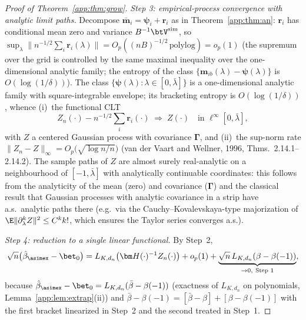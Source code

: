 \begin{proof}[Proof of Theorem~\ref{app:thm:grow}]
\emph{Step 3: empirical-process convergence with analytic limit paths.}
Decompose $\bar{\bm m}_i=\bm\psi_i+\bm r_i$ as in
Theorem~\ref{app:thm:an}: $\bm r_i$ has conditional mean zero and variance
$B^{-1}\btV^{\mathrm{sim}}$, so
$\sup_\lambda\|n^{-1/2}\sum_i\bm r_i(\lambda)\|
=O_p((nB)^{-1/2}\,\mathrm{polylog})=o_p(1)$
(the supremum over the grid is controlled by the same maximal
inequality over the one-dimensional analytic family; the entropy of the
class $\{\bm m_{ib}(\lambda)-\bm\psi(\lambda)\}$ is
$O(\log(1/\delta))$). The class
$\{\bm\psi(\lambda):\lambda\in[0,\bar\lambda]\}$ is a one-dimensional
analytic family with square-integrable envelope; its bracketing entropy
is $O(\log(1/\delta))$, whence (i)~the functional CLT
\[
  Z_n(\cdot)-n^{-1/2}\textstyle\sum_i\bm r_i(\cdot)
  \;\Rightarrow\;Z(\cdot)\quad\text{in }\ell^\infty[0,\bar\lambda],
\]
with $Z$ a centered Gaussian process with covariance $\bm\Gamma$, and
(ii)~the sup-norm rate
$\|Z_n-Z\|_\infty=O_p\bigl(\sqrt{\log n/n}\bigr)$
(van der Vaart and Wellner, 1996, Thms.~2.14.1--2.14.2). The
sample paths of $Z$ are almost surely real-analytic on a neighbourhood
of $[-1,\bar\lambda]$ with analytically continuable coordinates: this
follows from the analyticity of the mean (zero) and covariance
($\bm\Gamma$) and the classical result that Gaussian processes with
analytic covariance in a strip have a.s.\ analytic paths there
(e.g.\ via the Cauchy--Kovalevskaya-type majorization of
$\E\|\partial_\lambda^k Z\|^2\le C^k k!$, which ensures the Taylor
series converges a.s.).

\emph{Step 4: reduction to a single linear functional.} By Step~2,
\[
  \sqrt n\bigl(\hat\beta_{\asimex}-\bet_0\bigr)
  =L_{K,d_n}\bigl(\bm H(\cdot)^{-1}Z_n(\cdot)\bigr)
   +o_p(1)+\underbrace{\sqrt n\,L_{K,d_n}(\beta-\beta(-1))}_{\to0,\ \text{Step 1}},
\]
because $\hat\beta_{\asimex}-\bet_0=L_{K,d_n}(\bar\beta-\beta(-1))$
(exactness of $L_{K,d_n}$ on polynomials, Lemma~\ref{app:lem:extrap}(ii))
and $\bar\beta-\beta(-1)=[\bar\beta-\beta]+[\beta-\beta(-1)]$ with the
first bracket linearized in Step~2 and the second treated in Step~1.


\end{proof}
